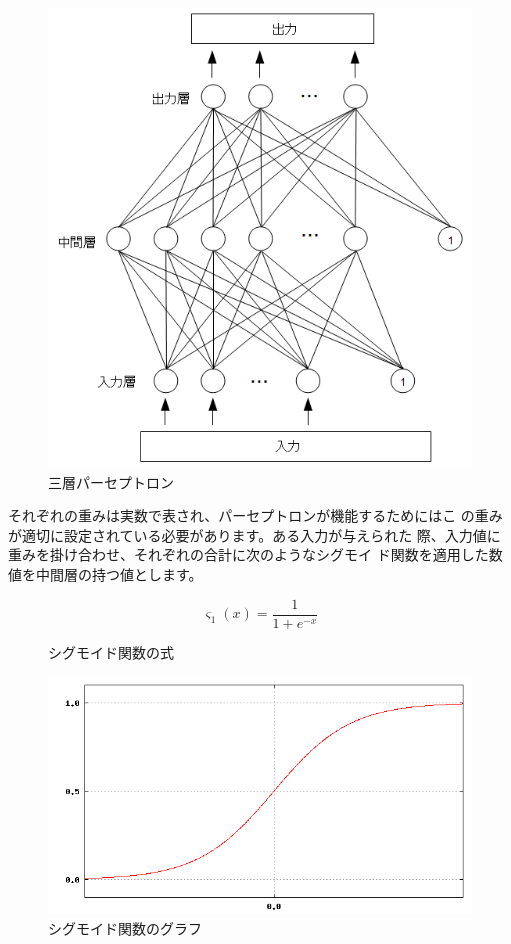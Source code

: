 \documentclass[mingoth,a4paper]{jsarticle}
\begin{document}
\begin{figure}[H]
\begin{center}
\includegraphics[width=0.45\hsize]{image201003/neuralnet01.png}
\caption{三層パーセプトロン}
\label{fig:neuralnet01}
\end{center}
\end{figure}

それぞれの重みは実数で表され、パーセプトロンが機能するためにはこ
の重みが適切に設定されている必要があります。ある入力が与えられた
際、入力値に重みを掛け合わせ、それぞれの合計に次のようなシグモイ
ド関数を適用した数値を中間層の持つ値とします。

\begin{multicols}{2}

\begin{figure}[H]
\begin{center}

\begin{equation*}
 \varsigma_1(x) = \frac{1}{1+e^{-x}}
\end{equation*}
\end{center}
\caption{シグモイド関数の式}
\end{figure}

\begin{figure}[H]
\begin{center}
\includegraphics[width=1.0\hsize]{image201003/neuralnet03.png}
\caption{シグモイド関数のグラフ}
\end{center}
\end{figure}

\end{multicols}
\end{document}
